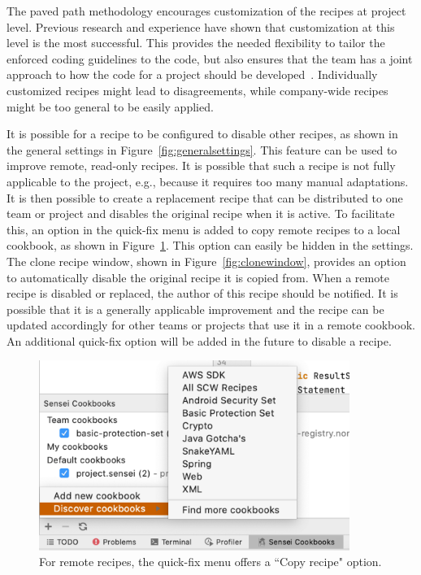 The paved path methodology encourages customization of the recipes at project level.
Previous research and experience have shown that customization at this level is the most successful.
This provides the needed flexibility to tailor the enforced coding guidelines to the code, but also ensures that the team has a joint approach to how the code for a project should be developed~\cite{sadowski2015tricorder}.
Individually customized recipes might lead to disagreements, while company-wide recipes might be too general to be easily applied.

It is possible for a recipe to be configured to disable other recipes, as shown in the general settings in Figure~\ref{fig:generalsettings}.
This feature can be used to improve remote, read-only recipes.
It is possible that such a recipe is not fully applicable to the project, e.g., because it requires too many manual adaptations.
It is then possible to create a replacement recipe that can be distributed to one team or project and disables the original recipe when it is active.
To facilitate this, an option in the quick-fix menu is added to copy remote recipes to a local cookbook, as shown in Figure~\ref{fig:copyrecipe}.
This option can easily be hidden in the settings.
The clone recipe window, shown in Figure~\ref{fig:clonewindow}, provides an option to automatically disable the original recipe it is copied from.
When a remote recipe is disabled or replaced, the author of this recipe should be notified.
It is possible that it is a generally applicable improvement and the recipe can be updated accordingly for other teams or projects that use it in a remote cookbook.
An additional quick-fix option will be added in the future to disable a recipe.

\begin{figure}
  \centering
  \includegraphics[width=0.9\textwidth,page=4]{04-tools/figures/figures1.pdf}
  \caption[Copy recipe option in the quick-fix menu]{For remote recipes, the quick-fix menu offers a ``Copy recipe" option.}
  \label{fig:copyrecipe} 
\end{figure}


